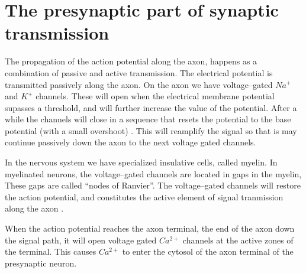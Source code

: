 \section{The presynaptic part of synaptic transmission}
The propagation of the action potential along the axon, happens as a combination of passive and active transmission.
The electrical potential is transmitted passively along the axon. On the axon we have voltage--gated $Na^+$ and $K^+$ channels.
These will open when the electrical membrane potential supasses a threshold, and will further increase the value of the potential. 
After a while the channels will close in a sequence that resets the potential to the base potential (with a small overshoot) \cite{PrinciplesOfNeuralScience4edKAP09}. 
This will reamplify the signal  so that is may continue passively down the axon to the next voltage gated channels.

In the nervous system we have specialized insulative cells, called myelin.
In myelinated neurons, the voltage--gated channels are located in gaps in the myelin, These gaps are called ``nodes of Ranvier''.
The voltage--gated channels will restore the action potential, and constitutes the active element of signal tranmission along the axon \cite{PrinciplesOfNeuralScience4edKAP09}.



When the action potential reaches the axon terminal, the end of the axon down the signal path, it will open voltage gated $Ca^{2+}$ channels at the active zones of the terminal. 
This causes $Ca^{2+}$ to enter the cytosol of the axon terminal of the presynaptic neuron\cite{PrinciplesOfNeuralScience4edKAP10}.

